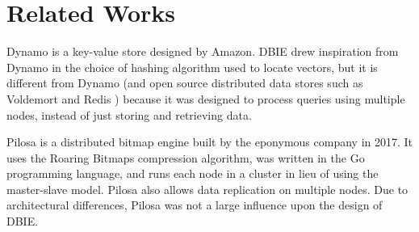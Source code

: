 \section{Related Works}
Dynamo \cite{decandia2007} is a key-value store designed by Amazon. DBIE drew
inspiration from Dynamo in the choice of hashing algorithm used to locate
vectors, but it is different from Dynamo (and open source distributed data
stores such as Voldemort \cite{voldemort} and Redis \cite{redis}) because it
was designed to process queries using multiple nodes, instead of just storing
and retrieving data.
\par
Pilosa \cite{pilosa} is a distributed bitmap engine built by the eponymous
company in 2017. It uses the Roaring Bitmaps \cite{roaring} compression
algorithm, was written in the Go programming language, and runs each node in a
cluster in lieu of using the master-slave model. Pilosa also allows data
replication on multiple nodes. Due to architectural differences,
Pilosa was not a large influence upon the design of DBIE.
